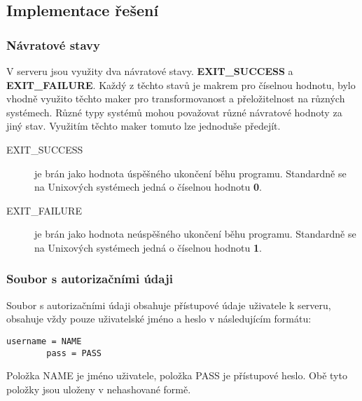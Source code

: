 \documentclass[11pt,a4paper]{report}
\begin{document}
    \clearpage
    \subsection{Implementace řešení}
    \subsubsection{Návratové stavy}
    V serveru jsou využity dva návratové stavy. \textbf{EXIT\_SUCCESS} a \textbf{EXIT\_FAILURE}. Každý z těchto stavů je makrem pro číselnou hodnotu, bylo vhodně využito těchto maker pro transformovanost a přeložitelnost na různých systémech. Různé typy systémů mohou považovat různé návratové hodnoty za jiný stav. Využitím těchto maker tomuto lze jednoduše předejít.
    \begin{description}
        \item [EXIT\_SUCCESS] je brán jako hodnota úspěšného ukončení běhu programu. Standardně se na Unixových systémech jedná o číselnou hodnotu \textbf{0}.
        \label{itm:exitsuccess}
        \item [EXIT\_FAILURE] je brán jako hodnota neúspěšného ukončení běhu programu. Standardně se na Unixových systémech jedná o číselnou hodnotu \textbf{1}.
        \label{itm:exitfailure}
    \end{description}
    \subsubsection{Soubor s autorizačními údaji}
    \label{subsec:authconfig}
    Soubor s autorizačními údaji obsahuje přístupové údaje uživatele k serveru, obsahuje vždy pouze uživatelské jméno a heslo v následujícím formátu:
    \begin{lstlisting}[frame=trBL]
        username = NAME
        pass = PASS
    \end{lstlisting}\par
    Položka NAME je jméno uživatele, položka PASS je přístupové heslo. Obě tyto položky jsou uloženy v nehashované formě.
\end{document}
